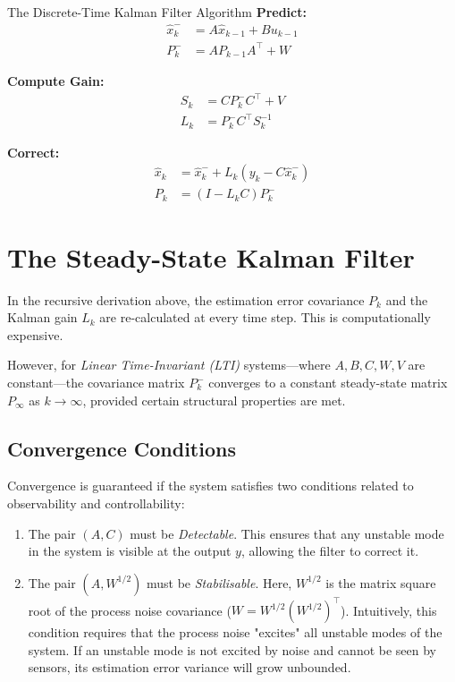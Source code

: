\begin{summarybox}{The Discrete-Time Kalman Filter Algorithm}
	\textbf{Predict:}
	\begin{align*}
		\hat{x}_k^- &= A \hat{x}_{k-1} + B u_{k-1} \\
		P_k^- &= A P_{k-1} A^\top  + W
	\end{align*}
	
	\textbf{Compute Gain:}
	\begin{align*}
		S_k &= C P_k^- C^\top  + V \\
		L_k &= P_k^- C^\top  S_k^{-1}
	\end{align*}
	
	\textbf{Correct:}
	\begin{align*}
		\hat{x}_k &= \hat{x}_k^- + L_k (y_k - C \hat{x}_k^-) \\
		P_k &= (I - L_k C) P_k^-
	\end{align*}
\end{summarybox}


\section{The Steady-State Kalman Filter}

In the recursive derivation above, the estimation error covariance $P_k$ and the Kalman gain $L_k$ are re-calculated at every time step. This is computationally expensive.

However, for \emph{Linear Time-Invariant (LTI)} systems—where $A, B, C, W, V$ are constant—the covariance matrix $P_k^-$ converges to a constant steady-state matrix $P_{\infty}$ as $k \to \infty$, provided certain structural properties are met.

\subsection{Convergence Conditions}
\label{sec:kalman_convergence}
Convergence is guaranteed if the system satisfies two conditions related to observability and controllability:
\begin{enumerate}
	\item The pair $(A, C)$ must be \emph{Detectable}. This ensures that any unstable mode in the system is visible at the output $y$, allowing the filter to correct it.
	\item The pair $(A, W^{1/2})$ must be \emph{Stabilisable}. Here, $W^{1/2}$ is the matrix square root of the process noise covariance ($W = W^{1/2}(W^{1/2})^\top$). Intuitively, this condition requires that the process noise "excites" all unstable modes of the system. If an unstable mode is not excited by noise and cannot be seen by sensors, its estimation error variance will grow unbounded.
\end{enumerate}

